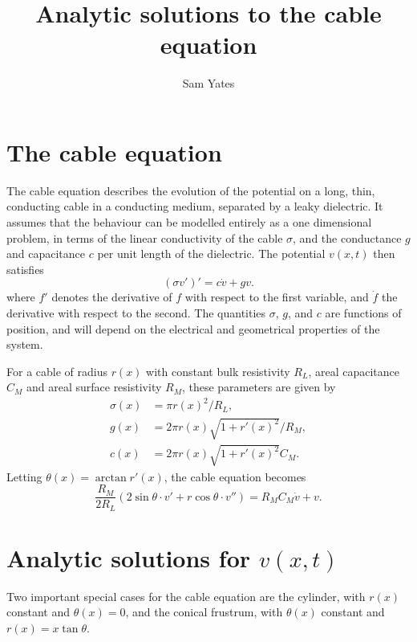\documentclass[parskip=half]{scrartcl}
\title{Analytic solutions to the cable equation}
\author{Sam Yates}
\theoremstyle{nonumberplain}
\begin{document}
\maketitle

\section{The cable equation}

The cable equation describes the evolution of the potential
on a long, thin, conducting cable in a conducting medium, separated
by a leaky dielectric. It assumes that the behaviour
can be modelled entirely as a one dimensional problem,
in terms of the linear conductivity of the cable $\sigma$,
and the conductance $g$ and capacitance $c$ per unit length of the
dielectric. The potential $v(x, t)$ then satisfies
\begin{equation}
    (\sigma v')' = c \dot v + g v.
\end{equation}
where $f'$ denotes the derivative of $f$ with respect to the first
variable, and $\dot{f}$ the derivative with respect to the second.
The quantities $\sigma$, $g$, and $c$ are functions of position,
and will depend on the electrical and geometrical properties of
the system.

For a cable of radius $r(x)$ with constant bulk resistivity
$R_L$, areal capacitance $C_M$ and areal surface resistivity
$R_M$, these parameters are given by
\begin{align}
    \sigma(x) &= \pi r(x)^2 / R_L, \\
    g(x) &= 2 \pi r(x) \sqrt{1 + r'(x)^2} / R_M, \\
    c(x) &= 2 \pi r(x) \sqrt{1 + r'(x)^2} C_M.
\end{align}
Letting $\theta(x) = \arctan r'(x)$, the cable equation becomes
\begin{equation}
    \label{eq:constelec}
    \frac{R_M}{2 R_L}\left(
	2\sin\theta\cdot v' + r \cos\theta\cdot v''
    \right) =
    R_M C_M \dot v + v.
\end{equation}

\section{Analytic solutions for $v(x, t)$}

Two important special cases for the cable equation are the cylinder,
with $r(x)$ constant and $\theta(x)=0$, and the conical frustrum,
with $\theta(x)$ constant and $r(x)=x\tan\theta$.
\end{document}
